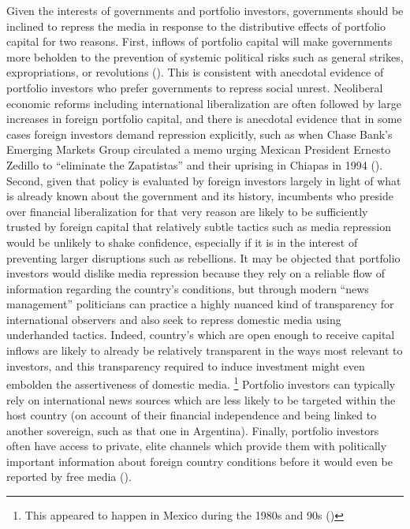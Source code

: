 \documentclass[12pt]{report}
\begin{document}
Given the interests of governments and portfolio investors, governments
should be inclined to repress the media in response to the distributive
effects of portfolio capital for two reasons. First, inflows of portfolio
capital will make governments more beholden to the prevention of systemic
political risks such as general strikes, expropriations, or revolutions
(\citealt{Clark:1997jg}). This is consistent with anecdotal evidence
of portfolio investors who prefer governments to repress social unrest.
Neoliberal economic reforms including international liberalization
are often followed by large increases in foreign portfolio capital,
and there is anecdotal evidence that in some cases foreign investors
demand repression explicitly, such as when Chase Bank's Emerging Markets
Group circulated a memo urging Mexican President Ernesto Zedillo to
``eliminate the Zapatistas'' and their uprising in Chiapas in 1994
(\citealt{Silverstein:1995wc}). Second, given that policy is evaluated
by foreign investors largely in light of what is already known about
the government and its history, incumbents who preside over financial
liberalization for that very reason are likely to be sufficiently
trusted by foreign capital that relatively subtle tactics such as
media repression would be unlikely to shake confidence, especially
if it is in the interest of preventing larger disruptions such as
rebellions. It may be objected that portfolio investors would dislike
media repression because they rely on a reliable flow of information
regarding the country's conditions, but through modern ``news management''
politicians can practice a highly nuanced kind of transparency for
international observers and also seek to repress domestic media using
underhanded tactics. Indeed, country's which are open enough to receive
capital inflows are likely to already be relatively transparent in
the ways most relevant to investors, and this transparency required
to induce investment might even embolden the assertiveness of domestic
media.%
\footnote{This appeared to happen in Mexico during the 1980s and 90s (\citealt{lawson2002building})%
} Portfolio investors can typically rely on international news sources
which are less likely to be targeted within the host country (on account
of their financial independence and being linked to another sovereign,
such as that one in Argentina). Finally, portfolio investors often
have access to private, elite channels which provide them with politically
important information about foreign country conditions before it would
even be reported by free media (\citet{Dube:2011uv}).
\end{document}
